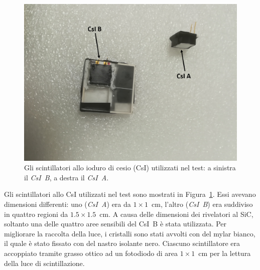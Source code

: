 
\begin{figure} [!p]
	\centering
	\includegraphics[scale=0.42]{Grafici/csi_etichette.png}
	\caption{Gli scintillatori allo ioduro di cesio (CsI) utilizzati nel test: a sinistra il \emph{CsI~B}, a destra il \emph{CsI~A}.} \label{fig:csi}
\end{figure}




Gli scintillatori allo CsI utilizzati nel test sono mostrati in Figura~\ref{fig:csi}.
Essi avevano dimensioni differenti: uno (\emph{CsI~A}) era da $1 \times 1$~cm, l'altro (\emph{CsI~B}) era suddiviso in quattro regioni da $1.5 \times 1.5$~cm. 
A causa delle dimensioni dei rivelatori al SiC, soltanto una delle quattro aree sensibili del CsI~B è stata utilizzata. Per migliorare la raccolta della luce, i cristalli sono stati avvolti con del mylar bianco, il quale è stato fissato con del nastro isolante nero.
%
%
Ciascuno scintillatore era accoppiato tramite grasso ottico ad un fotodiodo di area $1 \times 1$~cm per la lettura della luce di scintillazione. 



